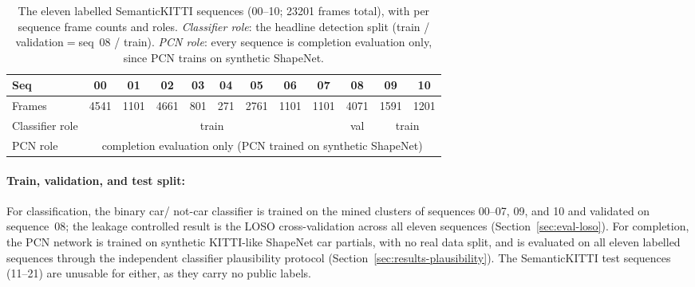 \documentclass[a4paper,12pt]{report}
\begin{document}
\begin{table}[H]
  \centering
  \caption[Labelled SemanticKITTI sequences and their roles]{The eleven labelled
    SemanticKITTI sequences (\numrange{00}{10}; \num{23201} frames total), with per sequence
    frame counts and roles. \emph{Classifier role}: the headline detection split (train /
    validation${}={}$seq~08 / train). \emph{PCN role}: every sequence is completion evaluation
    only, since PCN trains on synthetic ShapeNet.}
  \label{tab:dataset}
  \small
  \setlength{\tabcolsep}{5pt}
  \begin{tabular}{lccccccccccc}
    \toprule
    Seq & 00 & 01 & 02 & 03 & 04 & 05 & 06 & 07 & \multicolumn{1}{|c|}{08} & 09 & 10 \\
    \midrule
    Frames & 4541 & 1101 & 4661 & 801 & 271 & 2761 & 1101 & 1101 & \multicolumn{1}{|c|}{4071} & 1591 & 1201 \\
    Classifier role & \multicolumn{8}{c}{train} & \multicolumn{1}{|c|}{val} & \multicolumn{2}{c}{train} \\
    PCN role & \multicolumn{11}{c}{completion evaluation only (PCN trained on synthetic ShapeNet)} \\
    \bottomrule
  \end{tabular}
\end{table}

\paragraph{Train, validation, and test split:} For classification, the binary car/
not-car classifier is trained on the mined clusters of sequences \numrange{00}{07}, 09, and
10 and validated on sequence~08; the leakage controlled result is the LOSO cross-validation
across all eleven sequences (Section~\ref{sec:eval-loso}). For completion, the PCN
network is trained on synthetic KITTI-like ShapeNet car partials, with no real data split,
and is evaluated on all eleven labelled sequences through the independent classifier
plausibility protocol (Section~\ref{sec:results-plausibility}). The SemanticKITTI test
sequences (\numrange{11}{21}) are unusable for either, as they carry no public labels.
\end{document}
